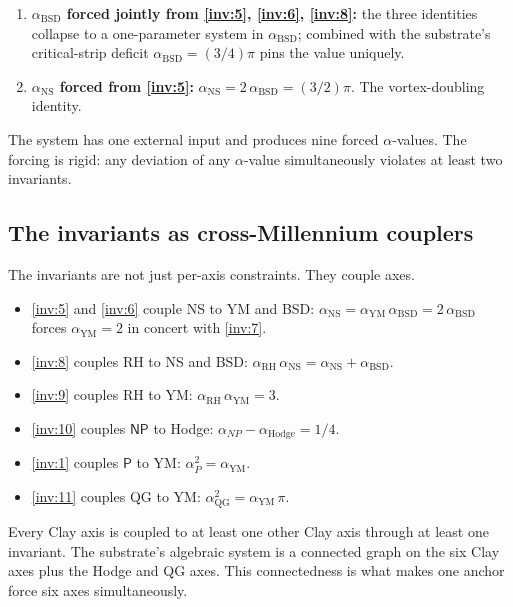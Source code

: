 \documentclass[11pt,a4paper]{article}
\theoremstyle{plain}
\theoremstyle{definition}
\begin{document}
\begin{enumerate}[leftmargin=*,nosep]
\item \textbf{$\alpha_{\mathrm{BSD}}$ forced jointly from
  \eqref{inv:5}, \eqref{inv:6}, \eqref{inv:8}:} the three identities
  collapse to a one-parameter system in $\alpha_{\mathrm{BSD}}$;
  combined with the substrate's critical-strip deficit
  $\alpha_{\mathrm{BSD}} = (3/4)\pi$ pins the value uniquely.

\item \textbf{$\alpha_{\mathrm{NS}}$ forced from \eqref{inv:5}:}
  $\alpha_{\mathrm{NS}} = 2\, \alpha_{\mathrm{BSD}} = (3/2)\pi$.
  The vortex-doubling identity.
\end{enumerate}

The system has one external input and produces nine forced
$\alpha$-values. The forcing is rigid: any deviation of any
$\alpha$-value simultaneously violates at least two invariants.

\subsection{The invariants as cross-Millennium couplers}
\label{sec:couplers}

The invariants are not just per-axis constraints. They couple axes.

\begin{itemize}[leftmargin=*,nosep]
\item \eqref{inv:5} and \eqref{inv:6} couple NS to YM and BSD:
  $\alpha_{\mathrm{NS}} = \alpha_{\mathrm{YM}}\, \alpha_{\mathrm{BSD}}
  = 2\, \alpha_{\mathrm{BSD}}$ forces
  $\alpha_{\mathrm{YM}} = 2$ in concert with \eqref{inv:7}.
\item \eqref{inv:8} couples RH to NS and BSD:
  $\alpha_{\mathrm{RH}}\, \alpha_{\mathrm{NS}}
  = \alpha_{\mathrm{NS}} + \alpha_{\mathrm{BSD}}$.
\item \eqref{inv:9} couples RH to YM:
  $\alpha_{\mathrm{RH}}\, \alpha_{\mathrm{YM}} = 3$.
\item \eqref{inv:10} couples $\mathsf{NP}$ to Hodge:
  $\alpha_{NP} - \alpha_{\mathrm{Hodge}} = 1/4$.
\item \eqref{inv:1} couples $\mathsf{P}$ to YM:
  $\alpha_{P}^{2} = \alpha_{\mathrm{YM}}$.
\item \eqref{inv:11} couples QG to YM: $\alpha_{\mathrm{QG}}^{2} =
  \alpha_{\mathrm{YM}}\, \pi$.
\end{itemize}

Every Clay axis is coupled to at least one other Clay axis through
at least one invariant. The substrate's algebraic system is a
connected graph on the six Clay axes plus the Hodge and QG axes.
This connectedness is what makes one anchor force six axes
simultaneously.
\end{document}
